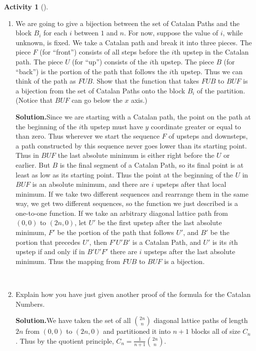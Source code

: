 \documentclass[10pt,]{book}
\theoremstyle{plain}
\theoremstyle{definition}
\newtheorem{activity}[project]{Activity}
\numberwithin{equation}{chapter}
\begin{document}
\begin{activity}[]
\begin{enumerate}[label=(\alph*)]
~\par
\item We are going to give a bijection between the set of Catalan Paths and the block \(B_i\) for each \(i\) between \(1\) and \(n\).  For now, suppose the value of \(i\), while unknown, is fixed.  We take a Catalan path and break it into three pieces.  The piece \(F\) (for ``front'') consists of all steps before the \(i\)th upstep in the Catalan path.  The piece \(U\) (for ``up'') consists of the \(i\)th upstep.  The piece \(B\) (for ``back'') is the portion of the path that follows the \(i\)th upstep.  Thus we can think of the path as \(FUB\).  Show that the function that takes \(FUB\) to \(BUF\) is a bijection from the set of Catalan Paths onto the block \(B_i\) of the partition.  (Notice that \(BUF\) can go below the \(x\) axis.)%
\par\medskip\noindent%
\textbf{Solution.}\quad Since we are starting with a Catalan path, the point on the path at the beginning of the \(i\)th upstep must have \(y\) coordinate greater or equal to than zero. Thus wherever we start the sequence \(F\) of upsteps and downsteps, a path constructed by this sequence never goes lower than its starting point. Thus in \(BUF\) the last absolute minimum is either right before the \(U\) or earlier. But \(B\) is the final segment of a Catalan Path, so its final point is at least as low as its starting point. Thus the point at the beginning of the \(U\) in \(BUF\) is an absolute minimum, and there are \(i\) upsteps after that local minimum. If we take two different sequences and rearrange them in the same way, we get two different sequences, so the function we just described is a one-to-one function. If we take an arbitrary diagonal lattice path from \((0,0)\) to \((2n,0)\), let \(U'\) be the first upstep after the last absolute minimum, \(F'\) be the portion of the path that follows \(U'\), and \(B'\) be the portion that precedes \(U'\), then \(F'U'B'\) is a Catalan Path, and \(U'\) is its \(i\)th upstep if and only if in \(B'U'F'\) there are \(i\) upsteps after the last absolute minimum. Thus the mapping from \(FUB\) to \(BUF\) is a bijection.%

~\par
\item Explain how you have just given another proof of the formula for the Catalan Numbers.%
\par\medskip\noindent%
\textbf{Solution.}\quad We have taken the set of all \(\binom{2n}{n}\) diagonal lattice paths of length \(2n\) from \((0,0)\) to \((2n,0)\) and partitioned it into \(n+1\) blocks all of size \(C_n\). Thus by the quotient principle, \(C_n=\frac{1}{n+1}\binom{2n}{n}\).%

\end{enumerate}
\end{activity}
\typeout{************************************************}
\typeout{************************************************}
\end{document}
